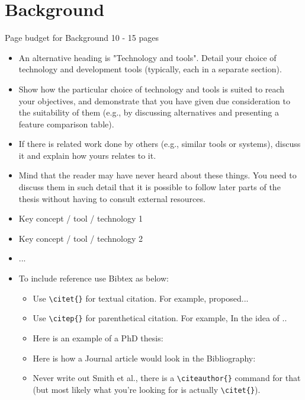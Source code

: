 
\chapter{Background}
\label{ch:background}
Page budget for Background 10 - 15 pages

\begin{itemize}
   \item An alternative heading is "Technology and tools".
Detail your choice of technology and development tools (typically, each in a separate section).
   \item Show how the particular choice of technology and tools is suited to reach your objectives, and demonstrate that you have given due consideration to the suitability of them (e.g., by discussing alternatives and presenting a feature comparison table).
   \item If there is related work done by others (e.g., similar tools or systems), discuss it and explain how yours relates to it.
   \item Mind that the reader may have never heard about these things. You need to discuss them in such detail that it is possible to follow later parts of the thesis without having to consult external resources.
    \item Key concept / tool / technology 1
    \item Key concept / tool / technology 2
    \item ...
    \item To include reference use Bibtex as below:
    \begin{itemize}
    \item Use \verb|\citet{}| for textual citation. For example, \citet{Balog:2018:Book} proposed...
    \item Use \verb|\citep{}| for parenthetical citation. For example, In \citep{Zhang:2020:KDD} the idea of ..
    \item Here is an example of a PhD thesis:  \citet{Maxwell:2019:PhDThesis} 
    \item Here is how a Journal article would look in the Bibliography: \citet{Sanderson:2010:FnTIR}
    \item Never write out Smith et al., there is a \verb|\citeauthor{}| command for that (but most likely what you're looking for is actually \verb|\citet{}|).
    \end{itemize}
\end{itemize}

